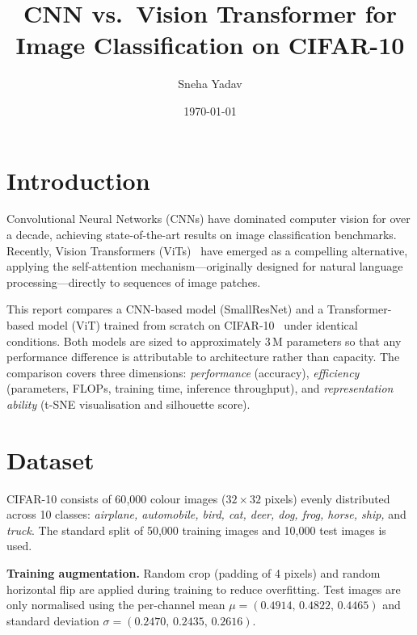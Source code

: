 \documentclass[11pt,a4paper]{article}
\title{\textbf{CNN vs.\ Vision Transformer for Image Classification on CIFAR-10}}
\author{Sneha Yadav}
\date{\today}
\begin{document}
\maketitle

\section{Introduction}

Convolutional Neural Networks (CNNs) have dominated computer vision for over a decade,
achieving state-of-the-art results on image classification benchmarks.
Recently, Vision Transformers (ViTs)~\cite{dosovitskiy2020vit} have emerged as a compelling
alternative, applying the self-attention mechanism—originally designed for natural language
processing—directly to sequences of image patches.

This report compares a CNN-based model (SmallResNet) and a Transformer-based model (ViT)
trained from scratch on CIFAR-10~\cite{krizhevsky2009cifar} under identical conditions.
Both models are sized to approximately 3\,M parameters so that any performance difference
is attributable to architecture rather than capacity.
The comparison covers three dimensions: \emph{performance} (accuracy),
\emph{efficiency} (parameters, FLOPs, training time, inference throughput), and
\emph{representation ability} (t-SNE visualisation and silhouette score).

\section{Dataset}

CIFAR-10 consists of 60{,}000 colour images ($32\times32$ pixels) evenly distributed
across 10 classes: \textit{airplane, automobile, bird, cat, deer, dog, frog, horse,
ship,} and \textit{truck}.
The standard split of 50{,}000 training images and 10{,}000 test images is used.

\textbf{Training augmentation.}
Random crop (padding of 4 pixels) and random horizontal flip are applied during training
to reduce overfitting.
Test images are only normalised using the per-channel mean
$\mu = (0.4914,\,0.4822,\,0.4465)$ and standard deviation
$\sigma = (0.2470,\,0.2435,\,0.2616)$.
\end{document}
